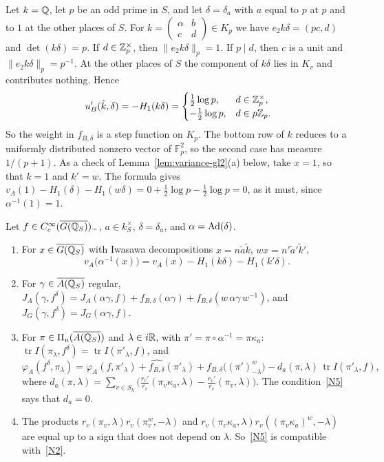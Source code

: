 \begin{example}\label{ex:uprime-gl2}
Let $k=\mathbb{Q}$, let $p$ be an odd prime in $S$, and let $\delta=\delta_a$
with $a$ equal to $p$ at $p$ and to $1$ at the other places of $S$. For
$k=\begin{pmatrix}\alpha&b\\c&d\end{pmatrix}\in K_p$ we have
$e_2k\delta=(pc,d)$ and $\det(k\delta)=p$. If $d\in\mathbb{Z}_p^\times$, then
$\|e_2k\delta\|_p=1$. If $p\mid d$, then $c$ is a unit and
$\|e_2k\delta\|_p=p^{-1}$. At the other places of $S$ the component of
$k\delta$ lies in $K_v$ and contributes nothing. Hence
\[
u'_B(\tilde k,\delta)=-H_1(k\delta)=\begin{cases}
\tfrac12\log p,&d\in\mathbb{Z}_p^\times,\\
-\tfrac12\log p,&d\in p\mathbb{Z}_p.
\end{cases}
\]
So the weight in $f_{B,\delta}$ is a step function on $K_p$. The bottom
row of $k$ reduces to a uniformly distributed nonzero vector of
$\mathbb F_p^2$, so the second case has measure $1/(p+1)$. As a check of
Lemma~\ref{lem:variance-gl2}(a) below, take $x=1$, so that $k=1$ and
$k'=w$. The formula gives $v_A(1)-H_1(\delta)-H_1(w\delta)=
0+\frac12\log p-\frac12\log p=0$, as it must, since $\alpha^{-1}(1)=1$.
\end{example}

\begin{lemma}\label{lem:variance-gl2}
Let $f\in C_c^\infty(\overline{G(\mathbb{Q}_S)})_-$, $a\in k_S^\times$, $\delta=\delta_a$, and
$\alpha=\operatorname{Ad}(\delta)$.
\begin{enumerate}[label=(\alph*)]
\item For $x\in\overline{G(\mathbb{Q}_S)}$ with Iwasawa decompositions $x=n\tilde a\tilde k$,
  $wx=n'\tilde a'\tilde k'$,
  \[
  v_A\bigl(\alpha^{-1}(x)\bigr)=v_A(x)-H_1(k\delta)-H_1(k'\delta).
  \]
\item For $\gamma\in\overline{A(\mathbb{Q}_S)}$ regular,
  $J_A(\gamma,f^\delta)=J_A(\alpha\gamma,f)+f_{B,\delta}(\alpha\gamma)+
  f_{B,\delta}(w\,\alpha\gamma\,w^{-1})$, and $J_G(\gamma,f^\delta)=
  J_G(\alpha\gamma,f)$.
\item For $\pi\in\Pi_u(\overline{A(\mathbb{Q}_S)})$ and $\lambda\in i\mathbb{R}$, with $\pi'=\pi\circ
  \alpha^{-1}=\pi\kappa_a$: $\operatorname{tr}I(\pi_\lambda,f^\delta)=
  \operatorname{tr}I(\pi'_\lambda,f)$, and
  \[
  \varphi_A(f^\delta,\pi_\lambda)=\varphi_A(f,\pi'_\lambda)+
  \widehat{f_{B,\delta}}(\pi'_\lambda)+\widehat{f_{B,\delta}}\bigl(
  (\pi')^w_{-\lambda}\bigr)-d_a(\pi,\lambda)\,\operatorname{tr}
  I(\pi'_\lambda,f),
  \]
  where $d_a(\pi,\lambda)=\sum_{v\in S_k}\bigl(\frac{r_v'}{r_v}(\pi_v
  \kappa_a,\lambda)-\frac{r_v'}{r_v}(\pi_v,\lambda)\bigr)$. The
  condition~\ref{N5} says that $d_a=0$.
\item The products $r_v(\pi_v,\lambda)r_v(\pi_v^w,-\lambda)$ and
  $r_v(\pi_v\kappa_a,\lambda)r_v((\pi_v\kappa_a)^w,-\lambda)$ are equal up
  to a sign that does not depend on $\lambda$. So~\ref{N5} is compatible
  with~\ref{N2}.
\end{enumerate}
\end{lemma}

